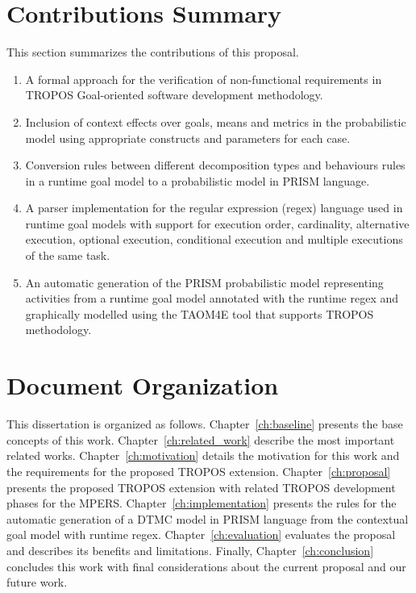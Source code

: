 \section{Contributions Summary}

This section summarizes the contributions of this proposal.


\begin{enumerate}

\item A formal approach for the verification of non-functional requirements in TROPOS Goal-oriented software development methodology.
\medskip

\item Inclusion of context effects over goals, means and metrics in the probabilistic model using appropriate constructs and parameters for each case.
\medskip

\item Conversion rules between different decomposition types and behaviours rules in a runtime goal model to a probabilistic model in PRISM language.
\medskip

\item A parser implementation for the regular expression (regex) language used in runtime goal models with support for execution order, cardinality, alternative execution, optional execution, conditional execution and multiple executions of the same task. 
\medskip

\item An automatic generation of the PRISM probabilistic model representing activities from a runtime goal model annotated with the runtime regex and graphically modelled using the TAOM4E tool that supports TROPOS methodology.

\end{enumerate}

\section{Document Organization}

This dissertation is organized as follows. Chapter~\ref{ch:baseline} presents the base concepts of this work. Chapter~\ref{ch:related_work} describe the most important related works. Chapter~\ref{ch:motivation} details the motivation for this work and the requirements for the proposed TROPOS extension. Chapter~\ref{ch:proposal} presents the proposed TROPOS extension with related TROPOS development phases for the MPERS. Chapter~\ref{ch:implementation} presents the rules for the automatic generation of a DTMC model in PRISM language from the contextual goal model with runtime regex. Chapter~\ref{ch:evaluation} evaluates the proposal and describes its benefits and limitations. Finally, Chapter~\ref{ch:conclusion} concludes this work with final considerations about the current proposal and our future work.